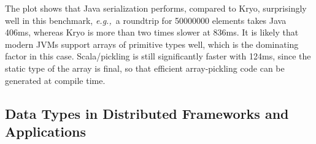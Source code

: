 \documentclass[10pt]{sigplanconf}
\theoremstyle{definition}
\theoremstyle{definition}
\newcommand{\eg}{{\em e.g.,~}}
\begin{document}
The plot shows that Java serialization performs, compared to Kryo, surprisingly well in this benchmark, \eg a roundtrip for 50000000 elements takes Java 406ms, whereas Kryo is more than two times slower at 836ms. It is likely that modern JVMs support arrays of primitive types well, which is the dominating factor in this case. Scala/pickling is still significantly faster with 124ms, since the static type of the array is final, so that efficient array-pickling code can be generated at compile time.

\subsection{Data Types in Distributed Frameworks and Applications}
\label{sec:data-types-in-distributed-applications}

\end{document}
